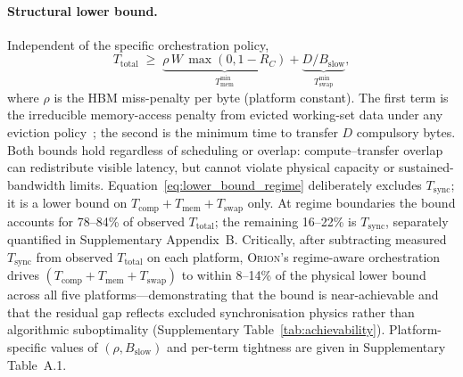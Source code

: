 \paragraph{Structural lower bound.}
Independent of the specific orchestration policy,
\begin{equation}
T_{\mathrm{total}} \;\geq\;
  \underbrace{\rho\,W\,\max(0,1-R_C)}_{T_{\mathrm{mem}}^{\min}}
+ \underbrace{D/B_{\mathrm{slow}}}_{T_{\mathrm{swap}}^{\min}},
\label{eq:lower_bound_regime}
\end{equation}
where $\rho$ is the HBM miss-penalty per byte (platform constant).
The first term is the irreducible memory-access penalty from evicted working-set
data under any eviction policy~\cite{mattson1970evaluation}; the second is the
minimum time to transfer $D$ compulsory bytes.
Both bounds hold regardless of scheduling or overlap: compute--transfer overlap
can redistribute visible latency, but cannot violate physical capacity or
sustained-bandwidth limits.
Equation~\eqref{eq:lower_bound_regime} deliberately excludes $T_{\mathrm{sync}}$;
it is a lower bound on $T_{\mathrm{comp}} + T_{\mathrm{mem}} + T_{\mathrm{swap}}$
only.
At regime boundaries the bound accounts for 78--84\% of observed
$T_{\mathrm{total}}$; the remaining 16--22\% is $T_{\mathrm{sync}}$,
separately quantified in Supplementary Appendix~B.
Critically, after subtracting measured $T_{\mathrm{sync}}$ from observed
$T_{\mathrm{total}}$ on each platform, \textsc{Orion}'s regime-aware
orchestration drives $(T_{\mathrm{comp}} + T_{\mathrm{mem}} + T_{\mathrm{swap}})$
to within 8--14\% of the physical lower bound across all five
platforms---demonstrating that the bound is near-achievable and that the
residual gap reflects excluded synchronisation physics rather than algorithmic
suboptimality (Supplementary Table~\ref{tab:achievability}).
Platform-specific values of $(\rho, B_{\mathrm{slow}})$ and per-term tightness
are given in Supplementary Table~A.1.

